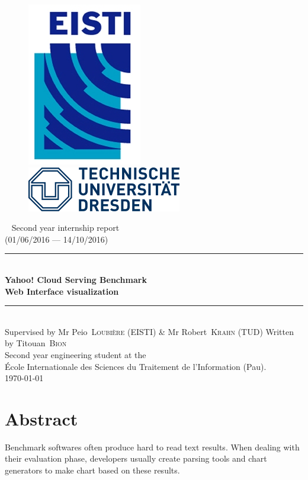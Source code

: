 \documentclass[a4paper,11pt]{report}
\newcommand*{\HRule}{\rule{\linewidth}{0.4mm}}  %
\newcommand*{\auteur}[2]{\large #1~\textsc{#2}} %
\newcommand{\pretitre}{Second year internship report \\ (01/06/2016 --- 14/10/2016)}
\newcommand{\grostitre}{Yahoo! Cloud Serving Benchmark \\ Web Interface visualization}
\newcommand{\auteurs}{Written by \auteur{Titouan}{Bion} \\ Second year engineering student at the \\ École Internationale des Sciences du Traitement de l'Information (Pau).}
\newcommand{\correcteurs}{Supervised by Mr \auteur{Peio}{Loubière} (EISTI) \& Mr \auteur{Robert}{Krahn} (TUD)}
\newcommand{\madate}{\today} %
\begin{document}


\begin{titlepage}
\begin{figure}[h]
\includegraphics[scale=1]{images/Logo_EISTI.png}
\hfill
\includegraphics[scale=0.6]{images/Logo_TUD.png}
\end{figure}
  \begin{center}
    ~
    \vfill
    {\Large\pretitre\\}           %
    \vspace{2cm}
    \HRule \\[0.4cm]
    {\Huge\bf\grostitre\\[0.4cm]} %
    \HRule \\[0.4cm]
    \vspace{2cm}
   	\correcteurs
    \medskip
    \vfill
    \auteurs\\                    %
    \vfill
    {\large\madate}               %
  \end{center}
\end{titlepage}

\chapter*{Abstract}

Benchmark softwares often produce hard to read text results. When dealing with their evaluation phase, developers usually create parsing tools and chart generators to make chart based on these results.
\end{document}
